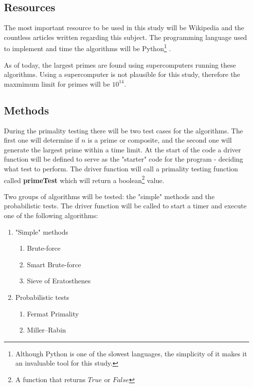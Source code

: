 \documentclass[main.tex]{subfiles}
\begin{document}
\subsection{Resources}

The most important resource to be used in this study will be Wikipedia and the countless articles written regarding this subject. The programming language used to implement and time the algorithms will be Python\footnote{Although Python is one of the slowest languages, the simplicity of it makes it an invaluable tool for this study.} \cite{python}.

As of today, the largest primes are found using supercomputers running these algorithms. Using a supercomputer is not plausible for this study, therefore the maxmimum limit for primes will be $10^{14}$.

\subsection{Methods}
During the primality testing \cite{prime:test} there will be two test cases for the algorithms. The first one will determine if $n$ is a prime or composite, and the second one will generate the largest prime within a time limit. At the start of the code a driver function will be defined to serve as the "starter" code for the program - deciding what test to perform. The driver function will call a primality testing function called \textbf{primeTest} which will return a boolean\footnote{A function that returns $True$ or $False$} value. 

Two groups of algorithms will be tested: the "simple" methods and the probabilistic tests. The driver function will be called to start a timer and execute one of the following algorithms:
\begin{enumerate}
    \item "Simple" methods
    \begin{enumerate}
        \item Brute-force%
        \item Smart Brute-force %
        \item Sieve of Eratosthenes \cite{prime:sieve}
    \end{enumerate}
    \item Probabilistic tests \cite{prime:test}
    \begin{enumerate}
        \item Fermat Primality
        \item Miller–Rabin
    \end{enumerate}
\end{enumerate}
\end{document}
